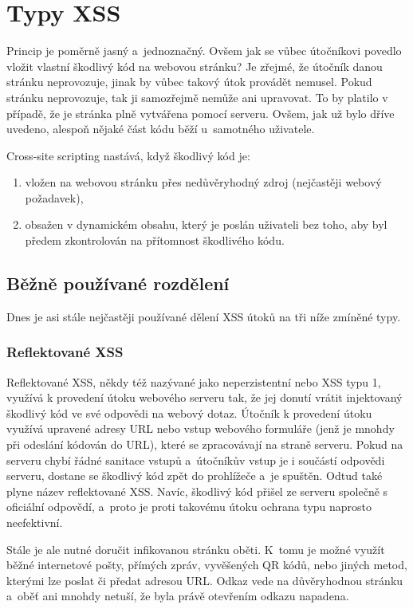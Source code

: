 \documentclass[11pt, conference, a4paper]{IEEEtran}
\begin{document}
\section{Typy XSS}
Princip je poměrně jasný a~jednoznačný. Ovšem jak se vůbec útočníkovi povedlo vložit vlastní škodlivý kód na webovou stránku? Je zřejmé, že útočník danou stránku neprovozuje, jinak by vůbec takový útok provádět nemusel. Pokud stránku neprovozuje, tak ji samozřejmě nemůže ani upravovat. To by platilo v případě, že je stránka plně vytvářena pomocí serveru. Ovšem, jak už bylo dříve uvedeno, alespoň nějaké část kódu běží u~samotného uživatele. 

Cross-site scripting nastává, když škodlivý kód je:
\begin{enumerate}
    \item vložen na webovou stránku přes nedůvěryhodný zdroj (nejčastěji webový požadavek),
    \item obsažen v dynamickém obsahu, který je poslán uživateli bez toho, aby byl předem zkontrolován na přítomnost škodlivého kódu.
\end{enumerate}

\subsection{Běžně používané rozdělení}
Dnes je asi stále nejčastěji používané dělení XSS útoků na tři níže zmíněné typy. 

\subsubsection{Reflektované XSS}
Reflektované XSS, někdy též nazývané jako neperzistentní nebo XSS typu 1, využívá k provedení útoku webového serveru tak, že jej donutí vrátit injektovaný škodlivý kód ve své odpovědi na webový dotaz. Útočník k provedení útoku využívá upravené adresy URL nebo vstup webového formuláře (jenž je mnohdy při odeslání kódován do URL), které se zpracovávají na straně serveru. Pokud na serveru chybí řádné sanitace vstupů a~útočníkův vstup je i součástí odpovědi serveru, dostane se škodlivý kód zpět do prohlížeče a~je spuštěn. Odtud také plyne název reflektované XSS. Navíc, škodlivý kód přišel ze serveru společně s oficiální odpovědí, a~proto je proti takovému útoku ochrana typu  naprosto neefektivní. 

Stále je ale nutné doručit infikovanou stránku oběti. K~tomu je možné využít běžné internetové pošty, přímých zpráv, vyvěšených QR kódů, nebo jiných metod, kterými lze poslat či předat adresou URL. Odkaz vede na důvěryhodnou stránku a~oběť ani mnohdy netuší, že byla právě otevřením odkazu napadena.
\end{document}
